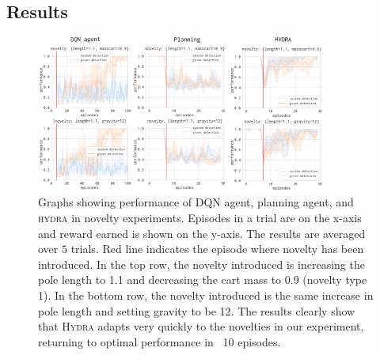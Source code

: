 \documentclass[letterpaper]{article} %
\newcommand{\hydra}{\textsc{Hydra}\xspace} %
\begin{document}



\subsection{Results}

\begin{figure}
    \centering
    \includegraphics[width=0.85\textwidth]{figures/experiments/compiled-results.pdf}

    \caption{Graphs showing performance of DQN agent, planning agent, and \textsc{hydra} in novelty experiments. Episodes in a trial are on the x-axis and reward earned is shown on the y-axis. The results are averaged over $5$ trials. Red line indicates the episode where novelty has been introduced. In the top row, the novelty introduced is increasing the pole length to 1.1 and decreasing the cart mass to 0.9 (novelty type 1). In the bottom row, the novelty introduced is the same increase in pole length and setting gravity to be 12. The results clearly show that \hydra adapts very quickly to the novelties in our experiment, returning to optimal performance in ~10 episodes.}
    \label{fig:combined-results}
\end{figure}
\end{document}
